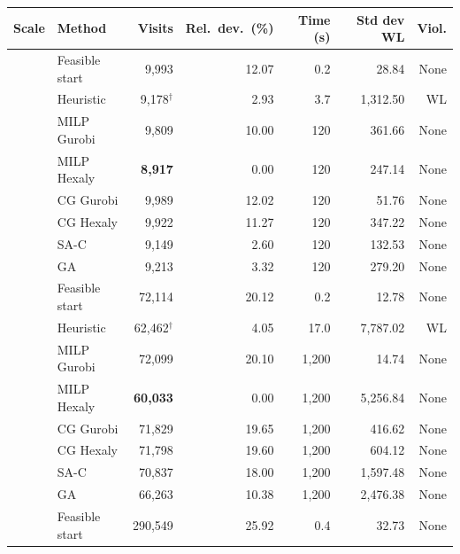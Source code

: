 \documentclass[]{interact}
\begin{document}
\begin{table}[t]
\centering
{}
{\small\begin{tabular}{@{}llrrrrr@{}}
\toprule
Scale & Method & Visits & Rel.\ dev.\ (\%) & Time (s) & Std dev WL & Viol. \\
\midrule
{}
 & Feasible start & 9{,}993 & 12.07 & 0.2 & 28.84 & None \\
 & Heuristic & 9{,}178$^\dagger$ & 2.93 & 3.7 & 1{,}312.50 & WL \\
 & MILP Gurobi & 9{,}809 & 10.00 & 120 & 361.66 & None \\
 & MILP Hexaly & \textbf{8{,}917} & 0.00 & 120 & 247.14 & None \\
 & CG Gurobi & 9{,}989 & 12.02 & 120 & 51.76 & None \\
 & CG Hexaly & 9{,}922 & 11.27 & 120 & 347.22 & None \\
 & SA-C & 9{,}149 & 2.60 & 120 & 132.53 & None \\
 & GA & 9{,}213 & 3.32 & 120 & 279.20 & None \\
\midrule
{}
 & Feasible start & 72{,}114 & 20.12 & 0.2 & 12.78 & None \\
 & Heuristic & 62{,}462$^\dagger$ & 4.05 & 17.0 & 7{,}787.02 & WL \\
 & MILP Gurobi & 72{,}099 & 20.10 & 1{,}200 & 14.74 & None \\
 & MILP Hexaly & \textbf{60{,}033} & 0.00 & 1{,}200 & 5{,}256.84 & None \\
 & CG Gurobi & 71{,}829 & 19.65 & 1{,}200 & 416.62 & None \\
 & CG Hexaly & 71{,}798 & 19.60 & 1{,}200 & 604.12 & None \\
 & SA-C & 70{,}837 & 18.00 & 1{,}200 & 1{,}597.48 & None \\
 & GA & 66{,}263 & 10.38 & 1{,}200 & 2{,}476.38 & None \\
\midrule
{}
 & Feasible start & 290{,}549 & 25.92 & 0.4 & 32.73 & None \\

\end{tabular}}
\end{table}
\end{document}
